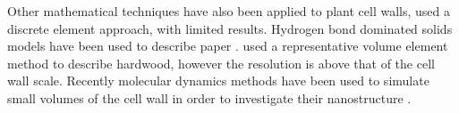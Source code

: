 Other mathematical techniques have also been applied to plant cell walls, \citet{HEPWORTH_1998} used a discrete element approach, with limited results. Hydrogen bond dominated solids models have been used to describe paper \citep{nissan1997link,batten1987unified,nissan1987unified,batten1987unified}. \citet{Zhan_2014} used a representative volume element method to describe hardwood, however the resolution is above that of the cell wall scale. 
Recently molecular dynamics methods have been used to simulate small volumes of the cell wall in order to investigate their nanostructure \citep{jin2015molecular,Charlier_2012,Sangha_2011,Zhang_2009,houtman1995cellulose}.
